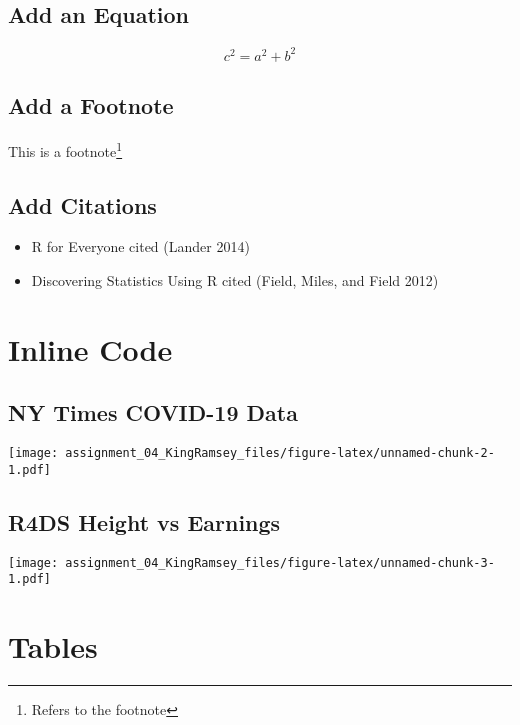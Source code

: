 \documentclass[
]{article}
\providecommand{\tightlist}{%
  \setlength{\itemsep}{0pt}\setlength{\parskip}{0pt}}
\begin{document}
\hypertarget{add-an-equation}{%
\subsection{Add an Equation}\label{add-an-equation}}

\[ c^2 = a^2 + b^2\]

\hypertarget{add-a-footnote}{%
\subsection{Add a Footnote}\label{add-a-footnote}}

This is a footnote\footnote{Refers to the footnote}

\hypertarget{add-citations}{%
\subsection{Add Citations}\label{add-citations}}

\begin{itemize}
\tightlist
\item
  R for Everyone cited (Lander 2014)
\item
  Discovering Statistics Using R cited (Field, Miles, and Field 2012)
\end{itemize}

\hypertarget{inline-code}{%
\section{Inline Code}\label{inline-code}}

\hypertarget{ny-times-covid-19-data}{%
\subsection{NY Times COVID-19 Data}\label{ny-times-covid-19-data}}

\texttt{[image: assignment\_04\_KingRamsey\_files/figure-latex/unnamed-chunk-2-1.pdf]}

\hypertarget{r4ds-height-vs-earnings}{%
\subsection{R4DS Height vs Earnings}\label{r4ds-height-vs-earnings}}

\texttt{[image: assignment\_04\_KingRamsey\_files/figure-latex/unnamed-chunk-3-1.pdf]}

\hypertarget{tables}{%
\section{Tables}\label{tables}}
\end{document}
